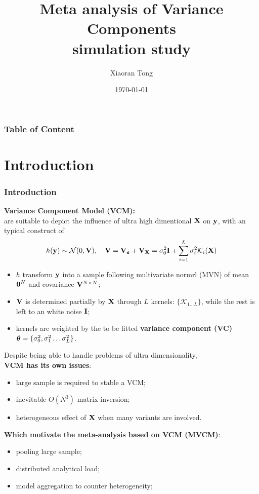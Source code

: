 \documentclass{beamer}
\title[Kernel Genomics]{Meta analysis of Variance Components \\
  simulation study}
\author{Xiaoran Tong} %
\institute[EPI Biosta,
MSU] %
{ Michigan State University \\ %
  \medskip \textit{tongxia1@msu.edu} \\%
  \textit{qlu@epi.msu.edu} %
} \date{\today} %
\begin{document}
\begin{frame}
  \titlepage %
\end{frame}

\begin{frame}
  \frametitle{Table of
    Content} %
  \tableofcontents
\end{frame}
\section{Introduction}
\begin{frame}
  \frametitle{Introduction} %
  \textbf{Variance Component Model (VCM):} \\
  are suitable to depict the influence of ultra high dimentional $\mathbf{X}$
  on $\mathbf{y}$, with an typical construct of
  \begin{align}\label{eq:vcm}
    h(\mathbf{y}) \sim \mathcal{N}(0, \mathbf{V}), \quad
    \mathbf{V} = \mathbf{V}_{\boldsymbol{e}} + \mathbf{V}_{\mathbf{X}} = \sigma^2_0 \textbf{I} + \sum_{i=1}^L
    \sigma^2_i \mathcal{K}_i(\mathbf{X})
  \end{align}
  \begin{itemize}
  \item $h$ transform $\mathbf{y}$ into a sample following multivariate
    normrl (MVN) of mean $\boldsymbol{0}^N$ and covariance $\mathbf{V}^{N \times N}$;
  \item $\mathbf{V}$ is determined partially by $\mathbf{X}$ through $L$ kernels:
    $\{\mathcal{K}_{1 \dots L}\}$, while the rest is left to an white
    noise $\textbf{I}$;
  \item kernels are weighted by the to be fitted \textbf{variance
      component (VC)}
    $\boldsymbol{\theta} = \{\sigma^2_0, \sigma^2_1 \dots \sigma^2_L\}$.
  \end{itemize}
\end{frame}
\begin{frame}
  Despite being able to handle problems of ultra dimensionality, \\
  \textbf{VCM has its own issues}:
  \begin{itemize}
  \item large sample is required to stable a VCM;
  \item inevitable $O(N^3)$ matrix inversion;
  \item heterogeneous effect of $\mathbf{X}$ when many variants are involved.
  \end{itemize}
  \textbf{Which motivate the meta-analysis based on VCM (MVCM)}:
  \begin{itemize}
  \item pooling large sample;
  \item distributed analytical load;
  \item model aggregation to counter heterogeneity;
  \end{itemize}
\end{frame}
\end{document}
